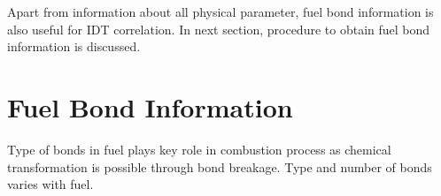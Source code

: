 \documentclass[preprint,12pt]{elsarticle}
\begin{document}
				 Apart from information about all physical parameter, fuel bond information is also useful  for IDT correlation. In next section, procedure to obtain fuel bond information is discussed.
					 
					  
						
					\section{Fuel Bond Information} \label{section:smile_bond}
					Type of bonds in fuel plays key role in combustion process as chemical transformation is possible through bond breakage. Type and number of bonds varies with fuel. 
				 
					
													
\end{document}
